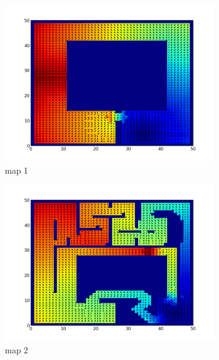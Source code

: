 \documentclass{article}
\begin{document}
\begin{figure}[h]
    \centering
    \begin{subfigure}[b]{0.45\textwidth}
        \includegraphics[width = \textwidth]{map1value_uncertain.png}
        \caption{map 1}
        \label{fig:map1value_mod}
    \end{subfigure}
    \begin{subfigure}[b]{0.45\textwidth}
        \includegraphics[width = \textwidth]{map2value_uncertain.png}
        \caption{map 2}
        \label{fig:map2value_mod}
    \end{subfigure}
    \begin{subfigure}[b]{0.45\textwidth}

\end{subfigure}
\end{figure}
\end{document}
